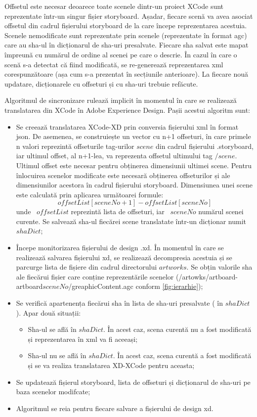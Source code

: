 Offsetul este necesar deoarece toate scenele dintr-un proiect XCode sunt reprezentate într-un singur fișier storyboard. Așadar, fiecare scenă va avea asociat offsetul din cadrul fișierului storyboard de la care începe reprezentarea acestuia. 
Scenele nemodificate sunt reprezentate prin scenele (reprezentate în format agc) care au sha-ul în dicționarul de sha-uri presalvate. Fiecare sha salvat este mapat împreună cu numărul de ordine al scenei pe care o descrie. 
În cazul în care o scenă s-a detectat că fiind modificată, se re-generează reprezentarea xml corespunzătoare (așa cum s-a prezentat în secțiunile anterioare).  La fiecare nouă updatare, dicționarele cu offseturi și cu sha-uri trebuie refăcute.

Algoritmul de sincronizare rulează implicit în momentul în care se realizează translatarea din XCode în Adobe Experience Design. Pașii acestui algoritm sunt:

\begin{itemize}  
\item Se creează translatarea XCode-XD prin conversia fișierului xml în format json. De asemenea, se construiește un vector cu n+1 offseturi, în care primele n valori reprezintă offseturile tag-urilor $scene$ din cadrul fișierului .storyboard, iar ultimul offset, al n+1-lea, va reprezenta offsetul ultimului tag $/scene$. Ultimul offset este necesar pentru obținerea dimensiunii ultimei scene. 
Pentru înlocuirea scenelor modificate este necesară obținerea offseturilor și ale dimensiunilor acestora în cadrul fișierului storyboard. Dimensiunea unei scene este calculată prin aplicarea următoarei formule:
\[offsetList[sceneNo + 1] - offsetList[sceneNo]\]
unde ~$offsetList$ reprezintă lista de offseturi, iar ~$sceneNo$ numărul scenei curente. Se salvează sha-ul fiecărei scene translatate într-un dicționar numit $shaDict$;

\item Începe monitorizarea fișierului de design .xd. În momentul în care se realizează salvarea fișierului xd, se realizează decompresia acestuia și se parcurge lista de fișiere din cadrul directorului $artworks$. Se obțin valorile sha ale fiecărui fișier care conține reprezentările scenelor (/artowks/artboard-artboard$sceneNo$/greaphicContent.agc conform \ref{fig:ierarhie}); 
\item Se verifică apartenența fiecărui sha în lista de sha-uri presalvate ( în $shaDict$). Apar două situații:
    \begin{itemize}  
    \item Sha-ul se află în $shaDict$. În acest caz, scena curentă nu a fost modificată și reprezentarea în xml va fi aceeași;
    \item Sha-ul nu se află în $shaDict$. În acest caz, scena curentă a fost modificată și se va realiza translatarea XD-XCode pentru aceasta;
    \end{itemize}
\item Se updatează fișierul storyboard, lista de offseturi și dicționarul de sha-uri pe baza scenelor modifcate;
\item Algoritmul se reia pentru fiecare salvare a fișierului de design xd.
\end{itemize}



